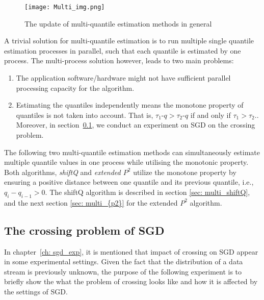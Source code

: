 \begin{figure}[h]
    \centering
	\texttt{[image: Multi\_img.png]}
	\caption{The update of multi-quantile estimation methods in general}
\end{figure}

A trivial solution for multi-quantile estimation is to run multiple single quantile estimation processes in parallel, such that each quantile is estimated by one process. The multi-process solution however, leads to two main problems:
\begin{enumerate}
    \item The application software/hardware might not have sufficient parallel processing capacity for the algorithm.
    \item Estimating the quantiles independently means the monotone property of quantiles is not taken into account. That is, $\tau_1$-$q > \tau_2$-$q$ if and only if $\tau_1 > \tau_2.$. Moreover, in section~\ref{subsec: crossing_SGD}, we conduct an experiment on SGD on the crossing problem.

\end{enumerate}

The following two multi-quantile estimation methods can simultaneously estimate multiple quantile values in one process while utilising the monotonic property. Both algorithms, \textit{shiftQ}\cite{hammerJointTrackingMultiple2019b} and \textit{extended $P^2$}\cite{raatikainenSequentialProcedureSimultaneous1993} utilize the monotone property by ensuring a positive distance between one quantile and its previous quantile, i.e.,
$q_{i} - q_{i-1} > 0$. The shiftQ algorithm is described in section \ref{sec: multi_shiftQ}, and the next section \ref{sec: multi_{p2}} for the extended $P^2$ algorithm.

\subsection{The crossing problem of SGD}
\label{subsec: crossing_SGD}

In chapter~\ref{ch: sgd_exp}, it is mentioned that impact of crossing on SGD appear in some experimental settings. Given the fact that the distribution of a data stream is previously unknown, the purpose of the following experiment is to briefly show the what the problem of crossing looks like and how it is affected by the settings of SGD.

